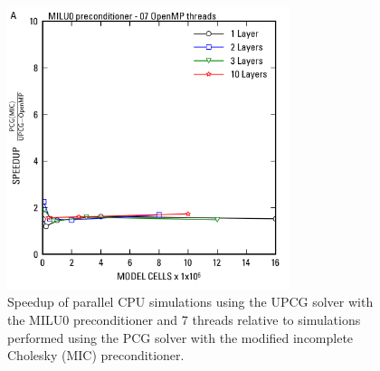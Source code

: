 \documentclass[12pt]{article}
\begin{document}
\newpage
\begin{figure}[hp]
	\centering
  	\includegraphics[width=8.25cm]{Figure6.png}
 	\caption{Speedup of parallel CPU simulations using the UPCG solver with the MILU0 preconditioner and 7 threads relative to simulations performed using the PCG solver with the modified incomplete Cholesky (MIC) preconditioner.}
	\label{FigOpenMPResults}
\end{figure}
\end{document}
